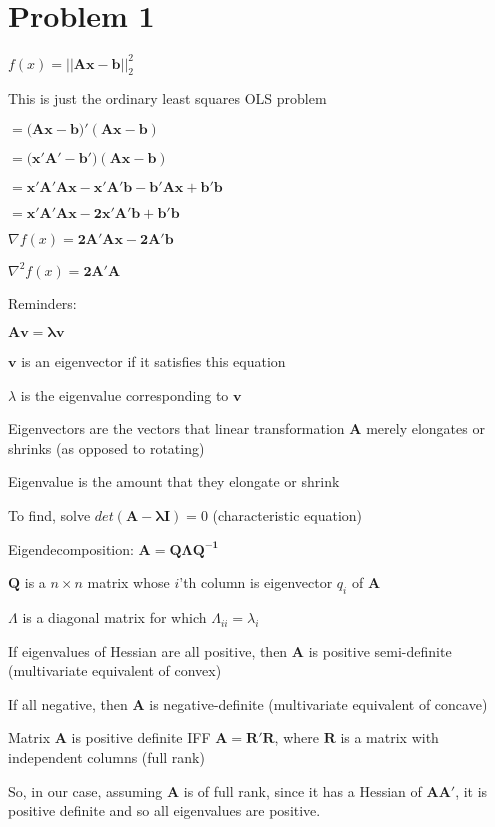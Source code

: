 \documentclass{article}
\begin{document}
\section{Problem 1}

$f(x) = ||\mathbf{Ax-b}||^2_2$

\medskip

This is just the ordinary least squares OLS problem

$= (\mathbf{Ax-b)'(Ax-b)}$

$= (\mathbf{x'A'-b')(Ax-b)}$

$= \mathbf{x'A'Ax - x'A'b - b'Ax + b'b}$

$= \mathbf{x'A'Ax - 2x'A'b + b'b}$

\medskip

$\nabla f(x) = \mathbf{2A'Ax-2A'b}$

$\nabla^2 f(x) = \mathbf{2A'A}$

\medskip

Reminders:

$\mathbf{Av = \lambda v}$

$\mathbf{v}$ is an eigenvector if it satisfies this equation

$\lambda$ is the eigenvalue corresponding to $\mathbf{v}$

Eigenvectors are the vectors that linear transformation $\mathbf{A}$ merely elongates or shrinks (as opposed to
rotating)

Eigenvalue is the amount that they elongate or shrink

To find, solve $det(\mathbf{A-\lambda I})=0$ (characteristic equation)

Eigendecomposition: $\mathbf{A=Q \Lambda Q^{-1}}$

$\mathbf{Q}$ is a $n \times n$ matrix whose $i$'th column is eigenvector $q_i$ of $\mathbf{A}$

$\Lambda$ is a diagonal matrix for which $\Lambda_{ii}=\lambda_i$

If eigenvalues of Hessian are all positive, then $\mathbf{A}$ is positive semi-definite (multivariate equivalent of
convex)

If all negative, then $\mathbf{A}$ is negative-definite (multivariate equivalent of concave)

Matrix $\mathbf{A}$ is positive definite IFF $\mathbf{A}=\mathbf{R}'\mathbf{R}$, where $\mathbf{R}$ is a matrix with
independent columns (full rank)

\medskip

So, in our case, assuming $\mathbf{A}$ is of full rank, since it has a Hessian of $\mathbf{A}\mathbf{A}'$, it is positive
definite and so all eigenvalues are positive.
\end{document}
